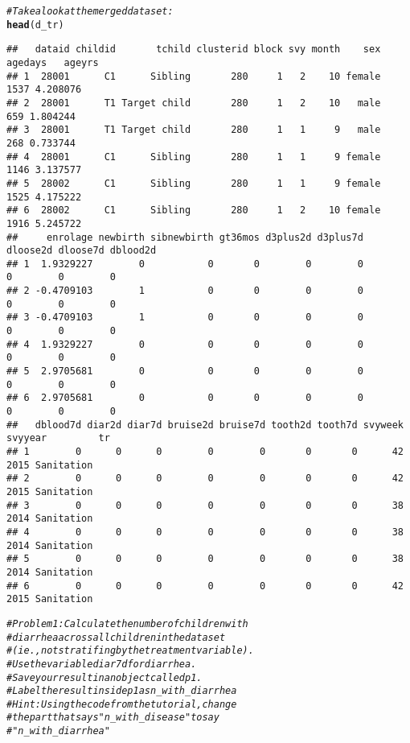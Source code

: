 \documentclass{article}\usepackage[]{graphicx}\usepackage[]{color}
\makeatletter
\newcommand{\hlcom}[1]{\textcolor[rgb]{0.678,0.584,0.686}{\textit{#1}}}%
\newcommand{\hlstd}[1]{\textcolor[rgb]{0.345,0.345,0.345}{#1}}%
\newcommand{\hlkwd}[1]{\textcolor[rgb]{0.737,0.353,0.396}{\textbf{#1}}}%
\newenvironment{kframe}{%
 \def\at@end@of@kframe{}%
 \ifinner\ifhmode%
  \def\at@end@of@kframe{\end{minipage}}%
  \begin{minipage}{\columnwidth}%
 \fi\fi%
 \def\FrameCommand##1{\hskip\@totalleftmargin \hskip-\fboxsep
 \colorbox{shadecolor}{##1}\hskip-\fboxsep
     \hskip-\linewidth \hskip-\@totalleftmargin \hskip\columnwidth}%
 \MakeFramed {\advance\hsize-\width
   \@totalleftmargin\z@ \linewidth\hsize
   \@setminipage}}%
 {\par\unskip\endMakeFramed%
 \at@end@of@kframe}
\newenvironment{knitrout}{}{} %
\makeatother
\begin{document}
\begin{knitrout}
\begin{kframe}
\begin{alltt}
\hlcom{# Take a look at the merged dataset:}
\hlkwd{head}\hlstd{(d_tr)}
\end{alltt}
\begin{verbatim}
##   dataid childid       tchild clusterid block svy month    sex agedays   ageyrs
## 1  28001      C1      Sibling       280     1   2    10 female    1537 4.208076
## 2  28001      T1 Target child       280     1   2    10   male     659 1.804244
## 3  28001      T1 Target child       280     1   1     9   male     268 0.733744
## 4  28001      C1      Sibling       280     1   1     9 female    1146 3.137577
## 5  28002      C1      Sibling       280     1   1     9 female    1525 4.175222
## 6  28002      C1      Sibling       280     1   2    10 female    1916 5.245722
##     enrolage newbirth sibnewbirth gt36mos d3plus2d d3plus7d dloose2d dloose7d dblood2d
## 1  1.9329227        0           0       0        0        0        0        0        0
## 2 -0.4709103        1           0       0        0        0        0        0        0
## 3 -0.4709103        1           0       0        0        0        0        0        0
## 4  1.9329227        0           0       0        0        0        0        0        0
## 5  2.9705681        0           0       0        0        0        0        0        0
## 6  2.9705681        0           0       0        0        0        0        0        0
##   dblood7d diar2d diar7d bruise2d bruise7d tooth2d tooth7d svyweek svyyear         tr
## 1        0      0      0        0        0       0       0      42    2015 Sanitation
## 2        0      0      0        0        0       0       0      42    2015 Sanitation
## 3        0      0      0        0        0       0       0      38    2014 Sanitation
## 4        0      0      0        0        0       0       0      38    2014 Sanitation
## 5        0      0      0        0        0       0       0      38    2014 Sanitation
## 6        0      0      0        0        0       0       0      42    2015 Sanitation
\end{verbatim}
\end{kframe}
\end{knitrout}
\begin{knitrout}
\color{fgcolor}\begin{kframe}
\begin{alltt}
\hlcom{# Problem 1: Calculate the number of children with}
\hlcom{# diarrhea across all children in the dataset }
\hlcom{# (ie., not stratifing by the treatment variable). }
\hlcom{# Use the variable diar7d for diarrhea. }
\hlcom{# Save your result in an object called p1. }
\hlcom{# Label the result inside p1 as n_with_diarrhea}
\hlcom{# Hint: Using the code from the tutorial, change}
\hlcom{# the part that says "n_with_disease" to say }
\hlcom{# "n_with_diarrhea"}
\end{alltt}
\end{kframe}
\end{knitrout}
\end{document}
